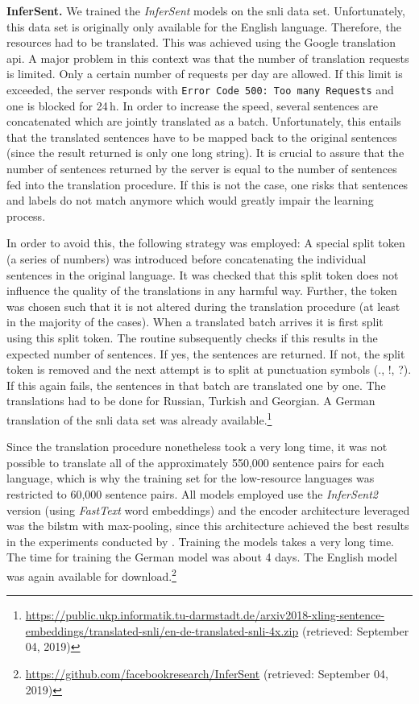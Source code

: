 \textbf{InferSent.} We trained the \textit{InferSent} models on the \gls{snli} data set. Unfortunately, this data set is originally only available for the English language. Therefore, the resources had to be translated. This was achieved using the Google translation \gls{api}. A major problem in this context was that the number of translation requests is limited. Only a certain number of requests per day are allowed. If this limit is exceeded, the server responds with \texttt{Error Code 500: Too many Requests} and one is blocked for 24\,h. In order to increase the speed, several sentences are concatenated which are jointly translated as a batch. Unfortunately, this entails that the translated sentences have to be mapped back to the original sentences (since the result returned is only one long string). It is crucial to assure that the number of sentences returned by the server is equal to the number of sentences fed into the translation procedure. If this is not the case, one risks that sentences and labels do not match anymore which would greatly impair the learning process.

In order to avoid this, the following strategy was employed: A special split token (a series of numbers) was introduced before concatenating the individual sentences in the original language. It was checked that this split token does not influence the quality of the translations in any harmful way. Further, the token was chosen such that it is not altered during the translation procedure (at least in the majority of the cases). When a translated batch arrives it is first split using this split token. The routine subsequently checks if this results in the expected number of sentences. If yes, the sentences are returned. If not, the split token is removed and the next attempt is to split at punctuation symbols (., !, ?). If this again fails, the sentences in that batch are translated one by one. The translations had to be done for Russian, Turkish and Georgian. A German translation of the \gls{snli} data set was already available.\footnote{\url{https://public.ukp.informatik.tu-darmstadt.de/arxiv2018-xling-sentence-embeddings/translated-snli/en-de-translated-snli-4x.zip} (retrieved: September 04, 2019)}

Since the translation procedure nonetheless took a very long time, it was not possible to translate all of the approximately 550,000 sentence pairs for each language, which is why the training set for the low-resource languages was restricted to 60,000 sentence pairs. All models employed use the \textit{InferSent2} version (using \textit{FastText} word embeddings) and the encoder architecture leveraged was the \gls{bilstm} with max-pooling, since this architecture achieved the best results in the experiments conducted by \citep{Conneau.2017}. Training the models takes a very long time. The time for training the German model was about 4 days. The English model was again available for download.\footnote{\url{https://github.com/facebookresearch/InferSent} (retrieved: September 04, 2019)}

